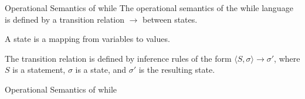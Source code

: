 \documentclass{beamer}
\begin{document}
    \begin{frame}{Operational Semantics of while}
      The operational semantics of the while language is defined by a transition relation $\rightarrow$ between states.
      
      A state is a mapping from variables to values.
      
      The transition relation is defined by inference rules of the form $\langle S, \sigma\rangle\rightarrow\sigma'$, where $S$ is a statement, $\sigma$ is a state, and $\sigma'$ is the resulting state.
      \end{frame}
      
      \begin{frame}{Operational Semantics of while}
        
      \end{frame}
  
  
  
  
  
  
\end{document}
